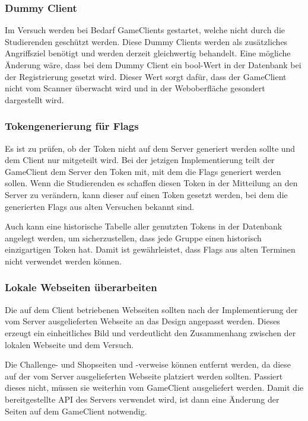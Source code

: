 \subsubsection{Dummy Client}
Im Versuch werden bei Bedarf GameClients gestartet, welche nicht durch die Studierenden geschützt werden. Diese Dummy Clients werden als zusätzliches Angriffsziel benötigt und werden derzeit gleichwertig behandelt. Eine mögliche Änderung wäre, dass bei dem Dummy Client ein bool-Wert in der Datenbank bei der Registrierung gesetzt wird. Dieser Wert sorgt dafür, dass der GameClient nicht vom Scanner überwacht wird und in der Weboberfläche gesondert dargestellt wird.

\subsubsection{Tokengenerierung für Flags}
Es ist zu prüfen, ob der Token nicht auf dem Server generiert werden sollte und dem Client nur mitgeteilt wird. Bei der jetzigen Implementierung teilt der GameClient dem Server den Token mit, mit dem die Flags generiert werden sollen. Wenn die   Studierenden es schaffen diesen Token in der Mitteilung an den Server zu verändern, kann dieser auf einen Token gesetzt werden, bei dem die generierten Flags aus alten Versuchen bekannt sind.

Auch kann eine historische Tabelle aller genutzten Tokens in der Datenbank angelegt werden, um sicherzustellen, dass jede Gruppe einen historisch einzigartigen Token hat. Damit ist gewährleistet, dass Flags aus alten Terminen nicht verwendet werden können.

\subsubsection{Lokale Webseiten überarbeiten}
Die auf dem Client betriebenen Webseiten sollten nach der Implementierung der vom Server ausgelieferten Webseite an das Design angepasst werden. Dieses erzeugt ein einheitliches Bild und verdeutlicht den Zusammenhang zwischen der lokalen Webseite und dem Versuch.

Die Challenge- und Shopseiten und -verweise können entfernt werden, da diese auf der vom Server ausgelieferten Webseite platziert werden sollten. Passiert dieses nicht, müssen sie weiterhin vom GameClient ausgeliefert werden. Damit die bereitgestellte API des Servers verwendet wird, ist dann eine Änderung der Seiten auf dem GameClient notwendig.


